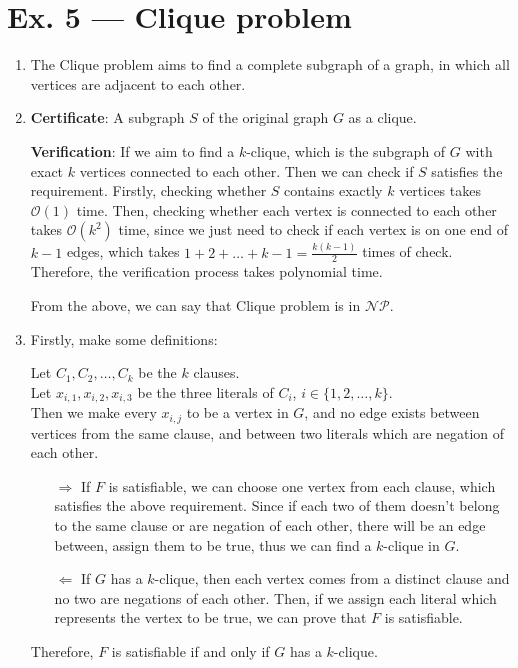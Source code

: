 \documentclass[12pt, a4paper]{article}
\begin{document}
\section*{Ex. 5 --- Clique problem}
\begin{enumerate}
    \item The Clique problem aims to find a complete subgraph of a graph, in which all vertices are adjacent to each other.
    \item \textbf{Certificate}: A subgraph $S$ of the original graph $G$ as a clique.
          
          \textbf{Verification}: If we aim to find a $k$-clique, which is the subgraph of $G$ with exact $k$ vertices connected to each other. 
          Then we can check if $S$ satisfies the requirement. Firstly, checking whether $S$ contains exactly $k$ vertices takes $\mathcal{O}(1)$ time. 
          Then, checking whether each vertex is connected to each other takes $\mathcal{O}(k^2)$ time, 
          since we just need to check if each vertex is on one end of $k-1$ edges, which takes $1+2+\dots+k-1 = \frac{k(k-1)}{2}$ times of check. 
          Therefore, the verification process takes polynomial time.

          From the above, we can say that Clique problem is in $\mathcal{NP}$.
    \item Firstly, make some definitions:
          
          Let $C_1, C_2, \dots, C_k$ be the $k$ clauses.\\
          Let $x_{i,1}, x_{i,2}, x_{i,3}$ be the three literals of $C_i$, $i\in \{1,2,\dots,k\}$.\\
          Then we make every $x_{i,j}$ to be a vertex in $G$, and no edge exists between vertices from the same clause, 
          and between two literals which are negation of each other.

          \begin{itemize}
              \item[$\Rightarrow$] If $F$ is satisfiable, we can choose one vertex from each clause, which satisfies the above requirement. 
                                   Since if each two of them doesn't belong to the same clause or are negation of each other, 
                                   there will be an edge between, assign them to be true, thus we can find a $k$-clique in $G$.
              \item[$\Leftarrow$] If $G$ has a $k$-clique, then each vertex comes from a distinct clause and no two are negations of each other. 
                                  Then, if we assign each literal which represents the vertex to be true, we can prove that $F$ is satisfiable. 
          \end{itemize}
          Therefore, $F$ is satisfiable if and only if $G$ has a $k$-clique.


\end{enumerate}
\end{document}
